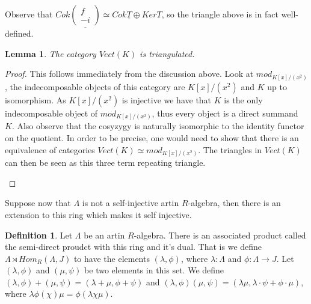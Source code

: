 \documentclass[11pt]{article}
\newtheorem{lemma}[theorem]{Lemma}
\theoremstyle{definition}
\newtheorem{definition}{Definition}[section]
\theoremstyle{remark}
\newcommand{\upside}[1]{\rotatebox[origin=c]{180}{#1}}
\begin{document}
            Observe that $Cok\underline{\begin{pmatrix} f \\ -i \end{pmatrix}} \simeq Cok\underline{T}\oplus Ker$\underline{\upside{$\Omega$}$T$}, so the triangle above is in fact well-defined.

            \begin{lemma}
                The category $Vect(K)$ is triangulated.
            \end{lemma}

            \begin{proof}
                This follows immediately from the discussion above. Look at $mod_{K[x]/(x^2)}$, the indecomposable objects of this category are $K[x]/(x^2)$ and $K$ up to isomorphism. As $K[x]/(x^2)$ is injective we have that $K$ is the only indecomposable object of \underline{$mod_{K[x]/(x^2)}$}, thus every object is a direct summand $K$. Also observe that the cosyzygy is naturally isomorphic to the identity functor on the quotient. In order to be precise, one would need to show that there is an equivalence of categories $Vect(K)\simeq mod_{K[x]/(x^2)}$. The triangles in $Vect(K)$ can then be seen as this three term repeating triangle.
                \begin{center}
                \end{center}
            \end{proof}

            Suppose now that $\Lambda$ is not a self-injective artin $R$-algebra, then there is an extension to this ring which makes it self injective.

            \begin{definition}
                Let $\Lambda$ be an artin $R$-algebra. There is an associated product called the semi-direct proudct with this ring and it's dual. That is we define $\Lambda \rtimes Hom_R(\Lambda,J)$ to have the elements $(\lambda, \phi)$, where $\lambda:\Lambda$ and $\phi:\Lambda\rightarrow J$. Let $(\lambda, \phi)$ and $(\mu, \psi)$ be two elements in this set. We define $(\lambda, \phi) + (\mu, \psi) = (\lambda + \mu, \phi + \psi)$ and $(\lambda, \phi)(\mu, \psi) = (\lambda\mu, \lambda\cdot\psi + \phi\cdot\mu)$, where $\lambda\phi (\chi)\mu = \phi(\lambda\chi\mu)$.
            \end{definition}
\end{document}
